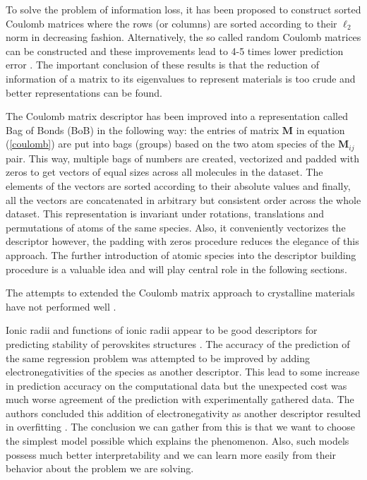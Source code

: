 \documentclass[11pt,oneside,czech,american]{book} %
\theoremstyle{definition} %
\theoremstyle{definition}
\begin{document}
To solve the problem of information loss, it has been proposed to construct sorted Coulomb matrices where the rows (or columns) are sorted according to their $\ell_{2}$ norm in decreasing fashion. Alternatively, the so called random Coulomb matrices can be constructed and these improvements lead to 4-5 times lower prediction error \parencite{hansen13}. The important conclusion of these results is that the reduction of information of a matrix to its eigenvalues to represent materials is too crude and better representations can be found.

The Coulomb matrix descriptor has been improved into a representation called Bag of Bonds (BoB) \parencite{hansen15} in the following way: the entries of matrix $\bm{M}$ in equation (\ref{coulomb}) are put into bags (groups) based on the two atom species of the $\bm{M}_{ij}$ pair. This way, multiple bags of numbers are created, vectorized and padded with zeros to get vectors of equal sizes across all molecules in the dataset. The elements of the vectors are sorted according to their absolute values and finally, all the vectors are concatenated in arbitrary but consistent order across the whole dataset. This representation is invariant under rotations, translations and permutations of atoms of the same species. Also, it conveniently vectorizes the descriptor however, the padding with zeros procedure reduces the elegance of this approach. The further introduction of atomic species into the descriptor building procedure is a valuable idea and will play central role in the following sections.

The attempts to extended the Coulomb matrix approach to crystalline materials have not performed well \parencite{faber15}. 

Ionic radii and functions of ionic radii appear to be good descriptors for predicting stability of perovskites structures \parencite{li19}. The accuracy of the prediction of the same regression problem was attempted to be improved by adding electronegativities of the species as another descriptor. This lead to some increase in prediction accuracy on the computational data but the unexpected cost was much worse agreement of the prediction with experimentally gathered data. The authors concluded this addition of electronegativity as another descriptor resulted in overfitting \parencite{li19}. The conclusion we can gather from this is that we want to choose the simplest model possible which explains the phenomenon. Also, such models possess much better interpretability and we can learn more easily from their behavior about the problem we are solving.
\end{document}

